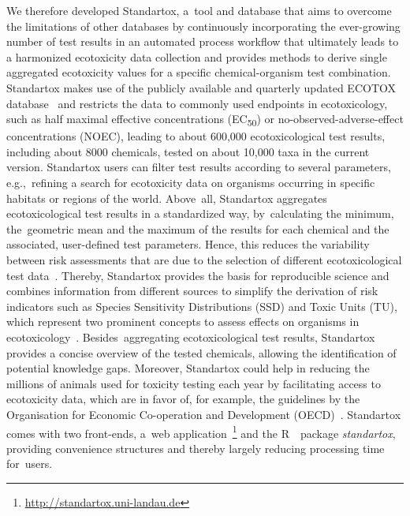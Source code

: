 \documentclass[data,datadescriptor,accept,moreauthors,pdftex]{Definitions/mdpi}
\begin{document}
We therefore developed Standartox, a~tool and database that aims to overcome the limitations of other databases by continuously incorporating the ever-growing number of test results in an automated process workflow that ultimately leads to a harmonized ecotoxicity data collection and provides methods to derive single aggregated ecotoxicity values for a specific chemical-organism test combination. Standartox makes use of the publicly available and quarterly updated ECOTOX database~\citep{usepa_ecotox_2019} and restricts the data to commonly used endpoints in ecotoxicology, such as half maximal effective concentrations (EC\textsubscript{50}) or no-observed-adverse-effect concentrations (NOEC), leading to about 600,000 ecotoxicological test results, including about 8000 chemicals, tested on about 10,000 taxa in the current version. Standartox users can filter test results according to several parameters, e.g.,~refining a search for ecotoxicity data on organisms occurring in specific habitats or regions of the world. Above~all, Standartox aggregates ecotoxicological test results in a standardized way, by~calculating the minimum, the~geometric mean and the maximum of the results for each chemical and the associated, user-defined test parameters. Hence, this reduces the variability between risk assessments that are due to the selection of different ecotoxicological test data~\citep{mark_analysis_1998}. Thereby, Standartox provides the basis for reproducible science and combines information from different sources to simplify the derivation of risk indicators such as Species Sensitivity Distributions (SSD) and Toxic Units (TU), which represent two prominent concepts to assess effects on organisms in ecotoxicology~\citep{posthuma_species_2002, kefford_definition_2011, schafer_effects_2011}. Besides~aggregating ecotoxicological test results, Standartox provides a concise overview of the tested chemicals, allowing the identification of potential knowledge gaps. Moreover, Standartox could help in reducing the millions of animals used for toxicity testing each year by facilitating access to ecotoxicity data, which are in favor of, for example, the guidelines by the Organisation for Economic Co-operation and Development (OECD)~\citep{oecd_oecd_2020, hartung_chemical_2009}. Standartox comes with two front-ends, a~web application~\footnote{\url{http://standartox.uni-landau.de}} and the R~\citep{rcoreteam_language_2020}~package \textit{standartox}, providing convenience structures and thereby largely reducing processing time for~users.
\end{document}
